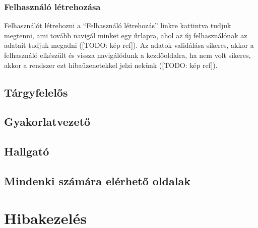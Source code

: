 \subsubsection{Felhasználó létrehozása}
Felhasználót létrehozni a ``Felhasználó létrehozás'' linkre kattintva tudjuk megtenni, ami tovább navigál minket egy űrlapra, ahol az új felhasználónak az adatait tudjuk megadni ([TODO: kép ref]). Az adatok validálása sikeres, akkor a felhasználó elkészült és vissza navigálódunk a kezdőoldalra, ha nem volt sikeres, akkor a rendszer ezt hibaüzenetekkel jelzi nekünk ([TODO: kép ref]).
\subsection{Tárgyfelelős}\label{step:teacher-role} 
\subsection{Gyakorlatvezető}\label{step:instructor-role}
\subsection{Hallgató}\label{step:student-role}
\subsection{Mindenki számára elérhető oldalak}\label{step:mindenkinek-elerheto-oldal}
\section{Hibakezelés}